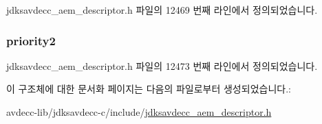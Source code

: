 jdksavdecc\+\_\+aem\+\_\+descriptor.\+h 파일의 12469 번째 라인에서 정의되었습니다.

\subsubsection[{\texorpdfstring{priority2}{priority2}}]{ priority2}\hypertarget{structjdksavdecc__descriptor__avb__interface_ac04b889463a96b43985cb82020e3c39b}{}\label{structjdksavdecc__descriptor__avb__interface_ac04b889463a96b43985cb82020e3c39b}


jdksavdecc\+\_\+aem\+\_\+descriptor.\+h 파일의 12473 번째 라인에서 정의되었습니다.



이 구조체에 대한 문서화 페이지는 다음의 파일로부터 생성되었습니다.\+:\begin{DoxyCompactItemize}
\item 
avdecc-\/lib/jdksavdecc-\/c/include/\hyperlink{jdksavdecc__aem__descriptor_8h}{jdksavdecc\+\_\+aem\+\_\+descriptor.\+h}\end{DoxyCompactItemize}

